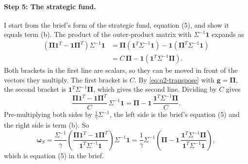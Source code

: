 \documentclass[11pt]{article}
\numberwithin{equation}{section}
\begin{document}
\paragraph{Step 5: The strategic fund.}
I start from the brief's form of the strategic fund, equation (5), and show it equals term (b). The product of the outer-product matrix with $\Sigma^{-1}\mathbf{1}$ expands as
\begin{align*}
  \left(\bm{\Pi}\mathbf{1}^{T} - \mathbf{1}\bm{\Pi}^{T}\right)\Sigma^{-1}\mathbf{1}
  &= \bm{\Pi}\left(\mathbf{1}^{T}\Sigma^{-1}\mathbf{1}\right) - \mathbf{1}\left(\bm{\Pi}^{T}\Sigma^{-1}\mathbf{1}\right) \\
  &= C\,\bm{\Pi} - \mathbf{1}\left(\mathbf{1}^{T}\Sigma^{-1}\bm{\Pi}\right).
\end{align*}
Both brackets in the first line are scalars, so they can be moved in front of the vectors they multiply. The first bracket is $C$. By \eqref{eq:q2-transpose} with $\mathbf{g} = \bm{\Pi}$, the second bracket is $\mathbf{1}^{T}\Sigma^{-1}\bm{\Pi}$, which gives the second line. Dividing by $C$ gives
\begin{equation*}
  \frac{\bm{\Pi}\mathbf{1}^{T} - \mathbf{1}\bm{\Pi}^{T}}{C}\,\Sigma^{-1}\mathbf{1}
  = \bm{\Pi} - \mathbf{1}\,\frac{\mathbf{1}^{T}\Sigma^{-1}\bm{\Pi}}{C}.
\end{equation*}
Pre-multiplying both sides by $\frac{1}{\gamma}\Sigma^{-1}$, the left side is the brief's equation (5) and the right side is term (b). So
\begin{equation}
  \bm{\omega}_{S}
  = \frac{\Sigma^{-1}}{\gamma}\left(\frac{\bm{\Pi}\mathbf{1}^{T} - \mathbf{1}\bm{\Pi}^{T}}{\mathbf{1}^{T}\Sigma^{-1}\mathbf{1}}\right)\Sigma^{-1}\mathbf{1}
  = \frac{1}{\gamma}\Sigma^{-1}\left(\bm{\Pi} - \mathbf{1}\,\frac{\mathbf{1}^{T}\Sigma^{-1}\bm{\Pi}}{\mathbf{1}^{T}\Sigma^{-1}\mathbf{1}}\right),
  \label{eq:q2-wS}
\end{equation}
which is equation (5) in the brief.
\end{document}
